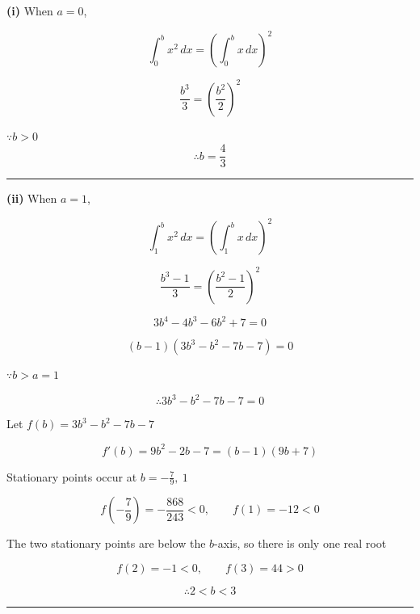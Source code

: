 \documentclass[12pt]{article}
\begin{document}
\newcommand{\ds}{\displaystyle}

\textbf{(i)} When $\ds a=0$,

$$\int_0^b x^2\,dx=\left(\int_0^b x\,dx\right)^2$$

$$\frac{b^3}{3}=\left(\frac{b^2}{2}\right)^2$$

$\because b>0$
$$\therefore b=\frac43$$

\bigskip\hrule\bigskip

\textbf{(ii)} When $\ds a=1$,

$$\int_1^b x^2\,dx=\left(\int_1^b x\,dx\right)^2$$

$$\frac{b^3-1}{3}=\left(\frac{b^2-1}{2}\right)^2$$

$$3b^4-4b^3-6b^2+7=0$$

$$(b-1)(3b^3-b^2-7b-7)=0$$

$\because b>a=1$

$$\therefore 3b^3-b^2-7b-7=0$$

Let $\ds f(b)=3b^3-b^2-7b-7$

$$f'(b)=9b^2-2b-7=(b-1)(9b+7)$$

Stationary points occur at $\ds b=-\frac79,\ 1$

$$f\left(-\frac79\right)=-\frac{868}{243}<0,\qquad f(1)=-12<0$$

\begin{center}
\end{center}

The two stationary points are below the $b$-axis, so there is only one real root

$$f(2)=-1<0,\qquad f(3)=44>0$$

$$\therefore 2<b<3$$

\bigskip\hrule\bigskip
\end{document}
